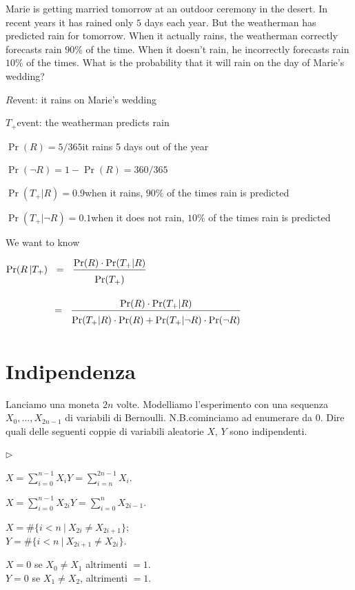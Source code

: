\documentclass[12pt,openany]{book}
\newcommand{\mylabel}[1]{{\footnotesize\textsf{#1}}\hfill}
\renewenvironment{itemize}
  {\begin{list}{$\triangleright$}{%
   \setlength{\parskip}{0mm}
   \setlength{\topsep}{.2\baselineskip}
   \setlength{\rightmargin}{0mm}
   \setlength{\listparindent}{0mm}
   \setlength{\itemindent}{0mm}
   \setlength{\labelwidth}{3ex}
   \setlength{\itemsep}{.4\baselineskip}
   \setlength{\parsep}{0mm}
   \setlength{\partopsep}{0mm}
   \setlength{\labelsep}{1ex}
   \setlength{\leftmargin}{\labelwidth+\labelsep}
   \let\makelabel\mylabel}}{%
   \end{list}\vspace*{-1.3mm}}
\theoremstyle{mio}
\theoremstyle{liscio}
\begin{document}
Marie is getting married tomorrow at an outdoor ceremony in the desert. In recent years it has rained only $5$ days each year. But the weatherman has predicted rain for tomorrow. When it actually rains, the weatherman correctly forecasts rain $90\%$ of the time. When it doesn’t rain, he incorrectly forecasts rain $10\%$ of the times. What is the probability that it will rain on the day of Marie’s wedding?


$R$\hfill event: it rains on Marie’s wedding

$T_+$\hfill event: the weatherman predicts rain

$\Pr(R) = 5/365$\hfill it rains 5 days out of the year

$\Pr(\neg R) = 1-\Pr(R)= 360/365$

$\Pr(T_+|R) = 0.9$\hfill when it rains, $90\%$ of the times rain is predicted

$\Pr(T_+|\neg R) = 0.1$\hfill when it does not rain, $10\%$ of the times rain is predicted

\bigskip
We want to know

$\displaystyle \Pr(R\,| T_+)\medrel{=}\frac{\Pr(R)\cdot \Pr(T_+|R)}{\Pr(T_+)\vphantom{\Big[}}$

$\displaystyle\hphantom{\Pr(R | T_+)}\medrel{=}\frac{\Pr(R)\cdot \Pr(T_+|R)}{\Pr(T_+|R)\cdot \Pr(R)+ \Pr(T_+|\neg R)\cdot \Pr(\neg R)\vphantom{\Big[}}$


\hfill{}\clearpage\section{Indipendenza}
\label{esercizio_indipendenza}

Lanciamo una moneta $2n$ volte. Modelliamo l'esperimento con una sequenza $X_0,\dots,X_{2n-1}$ di variabili di Bernoulli. N.B.\@ cominciamo ad enumerare da $0$. Dire quali delle seguenti coppie di variabili aleatorie $X$, $Y$ sono indipendenti.\medskip

\begin{itemize}
\item[1.] $\displaystyle X=\sum_{i=0}^{n-1}X_i$\qquad $\displaystyle Y=\sum_{i=n}^{2n-1}X_i$.


\item[2.] $\displaystyle X=\sum_{i=0}^{n-1}X_{2i}$\qquad $\displaystyle Y=\sum_{i=0}^{n} X_{2i-1}$.\bigskip

\item[3.] $X= \#\big\{i<n\ |\ X_{2i}\neq X_{2i+1}\big\}$;\\
$Y= \#\big\{i<n\ |\ X_{2i+1}\neq X_{2i}\big\}$.\bigskip

\item[4.] $X=0$ se $X_0\neq X_1$ altrimenti $=1$. \\
$Y=0$ se $X_1\neq X_2$, altrimenti $=1$.

\end{itemize}
\end{document}
